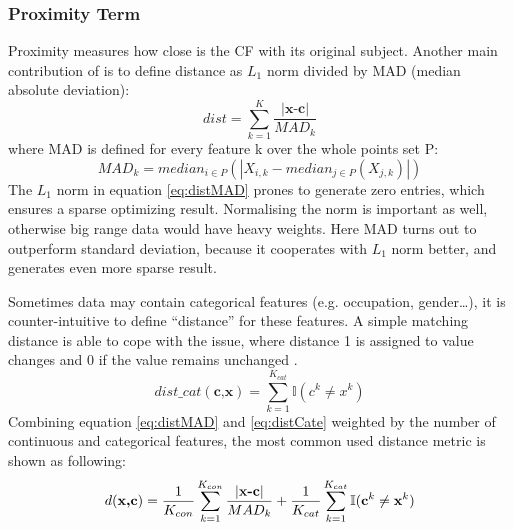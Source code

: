 \subsubsection{Proximity Term} Proximity measures how close is the CF with its original subject. Another main contribution of \cite{watcher2017} is to define distance as \emph{$L_1$} norm divided by MAD (median absolute deviation):
\begin{equation}\label{eq:distMAD}
  dist = \sum_{k=1}^{K}\frac{|\textbf{x-c}|}{MAD_k}
\end{equation}
where MAD is defined for every feature k over the whole points set P:
\begin{equation}\label{eq:MAD}
  MAD_k=median_{i\in P}(|{X_{i,k}}-median_{j\in P}(X_{j,k})|)
\end{equation}
The \emph{$L_1$} norm in equation \ref{eq:distMAD} prones to generate zero entries, which ensures a sparse optimizing result. Normalising the norm is important as well, otherwise big range data would have heavy weights. Here MAD turns out to outperform standard deviation, because it cooperates with \emph{$L_1$} norm better, and generates even more sparse result.

Sometimes data may contain categorical features (e.g. occupation, gender\dots), it is counter-intuitive to define ``distance'' for these features. A simple matching distance is able to cope with the issue, where distance 1 is assigned to value changes and 0 if the value remains unchanged \cite{DiCE}.
\begin{equation}\label{eq:distCate}
  dist\_cat(\textbf{c,x})=\sum_{k=1}^{K_{cat}}\mathbb{I}(c^k\neq x^k)
\end{equation}
Combining equation \ref{eq:distMAD} and \ref{eq:distCate} weighted by the number of continuous and categorical features, the most common used distance metric is shown as following:
\begin{equation}\label{eq:distCombined}
  d(\textbf{x,c})=\frac{1}{K_{con}}\sum_{k=1}^{K_{con}}\frac{|\textbf{x-c}|}{MAD_k}
  +\frac{1}{K_{cat}}\sum_{k=1}^{K_{cat}}\mathbb{I}(\textbf c^k
  \neq \textbf x^k)
\end{equation}

